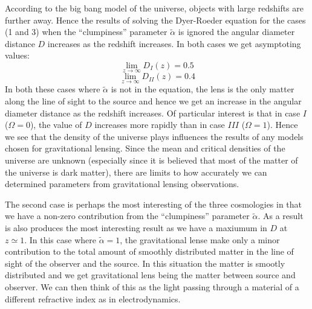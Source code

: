 \documentclass[a4paper]{IEEEtran}
\begin{document}
According to the big bang model of the universe, objects with large
redshifts are further away. Hence the results of solving the Dyer-Roeder
equation for the cases (1 and 3) when the ``clumpiness'' parameter 
$\tilde{\alpha}$ is ignored the angular diameter distance $D$ increases
as the redshift increases. In both cases we get asymptoting values:
\begin{equation}
    \lim_{z \rightarrow \infty} D_{I}(z) = 0.5
\end{equation}
\begin{equation}
    \lim_{z \rightarrow \infty} D_{II}(z) = 0.4
\end{equation}
In both these cases where $\tilde{\alpha}$ is not in the equation, 
the lens is the only matter along the line of sight to the source and
hence we get an increase in the angular diameter distance as the redshift 
increases. Of particular interest is that in case $I$ ($\Omega = 0$), 
the value of $D$ increases more rapidly than in case $III$ ($\Omega = 1$).
Hence we see that the density of the universe plays influences the results
of any models chosen for gravitational lensing. Since the mean and 
critical densities of the universe are unknown (especially since it is
believed that most of the matter of the universe is dark matter), 
there are limits to how accurately we can determined parameters from
gravitational lensing observations.

The second case is perhaps the most interesting of the three cosmologies
in that we have a non-zero contribution from the ``clumpiness'' parameter
$\tilde{\alpha}$. As a result is also produces the most interesting result
as we have a maxiumum in $D$ at $z \simeq 1$. 
In this case where $\tilde{\alpha} = 1$, the gravitational lense
make only a minor contribution to the total amount of smoothly distributed
matter in the line of sight of the observer and the source. In this situation
the matter is smootly distributed and we get gravitational lens being
the matter between source and observer. We can then think of this
as the light passing through a material of a different refractive index
as in electrodynamics.
\end{document}
